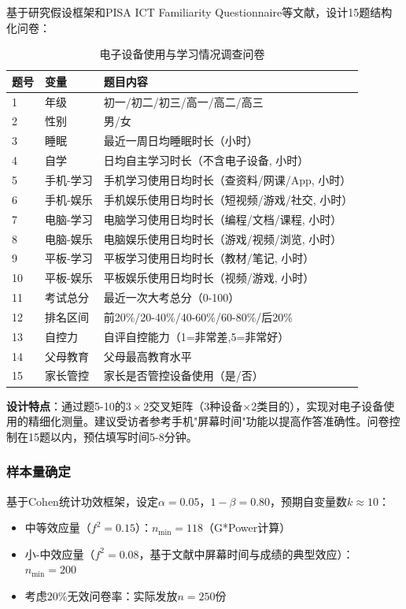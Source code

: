 \documentclass[11pt]{ctexart}
\begin{document}
基于研究假设框架和PISA ICT Familiarity Questionnaire等文献，设计15题结构化问卷：

\begin{table}[H]
\centering
\caption{电子设备使用与学习情况调查问卷}
\small
\begin{tabular}{lll}
\toprule
题号 & 变量 & 题目内容 \\
\midrule
1 & 年级 & 初一/初二/初三/高一/高二/高三 \\
2 & 性别 & 男/女 \\
3 & 睡眠 & 最近一周日均睡眠时长（小时）\\
4 & 自学 & 日均自主学习时长（不含电子设备, 小时）\\
5 & 手机-学习 & 手机学习使用日均时长（查资料/网课/App, 小时）\\
6 & 手机-娱乐 & 手机娱乐使用日均时长（短视频/游戏/社交, 小时）\\
7 & 电脑-学习 & 电脑学习使用日均时长（编程/文档/课程, 小时）\\
8 & 电脑-娱乐 & 电脑娱乐使用日均时长（游戏/视频/浏览, 小时）\\
9 & 平板-学习 & 平板学习使用日均时长（教材/笔记, 小时）\\
10 & 平板-娱乐 & 平板娱乐使用日均时长（视频/游戏, 小时）\\
11 & 考试总分 & 最近一次大考总分（0-100）\\
12 & 排名区间 & 前20\%/20-40\%/40-60\%/60-80\%/后20\% \\
13 & 自控力 & 自评自控能力（1=非常差,5=非常好）\\
14 & 父母教育 & 父母最高教育水平 \\
15 & 家长管控 & 家长是否管控设备使用（是/否）\\
\bottomrule
\end{tabular}
\end{table}

\textbf{设计特点}：通过题5-10的$3\times2$交叉矩阵（3种设备$\times$2类目的），实现对电子设备使用的精细化测量。建议受访者参考手机"屏幕时间"功能以提高作答准确性。问卷控制在15题以内，预估填写时间5-8分钟。

\subsubsection{样本量确定}

基于Cohen统计功效框架，设定$\alpha=0.05$，$1-\beta=0.80$，预期自变量数$k\approx10$：
\begin{itemize}
    \item 中等效应量（$f^2=0.15$）：$n_{\min}=118$（G*Power计算）
    \item 小-中效应量（$f^2=0.08$，基于文献中屏幕时间与成绩的典型效应）：$n_{\min}=200$
    \item 考虑20\%无效问卷率：实际发放$n=250$份
\end{itemize}
\end{document}
